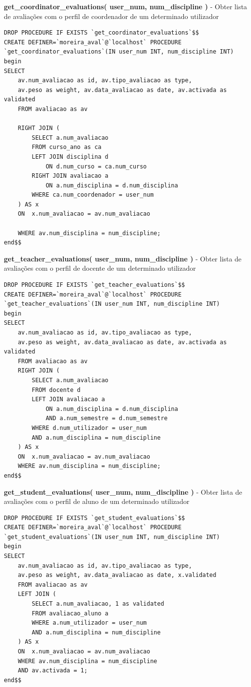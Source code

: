 \begin{list}{\textbf{-}}{\textbf{STORED PROCEDURES}}
\item \textbf{get\_coordinator\_evaluations( user\_num, num\_discipline )} - Obter lista de avaliações com o perfil de coordenador de um determinado utilizador
\begin{lstlisting}
DROP PROCEDURE IF EXISTS `get_coordinator_evaluations`$$
CREATE DEFINER=`moreira_aval`@`localhost` PROCEDURE `get_coordinator_evaluations`(IN user_num INT, num_discipline INT)
begin
SELECT 
	av.num_avaliacao as id, av.tipo_avaliacao as type, 
	av.peso as weight, av.data_avaliacao as date, av.activada as validated
	FROM avaliacao as av
	
	RIGHT JOIN (
		SELECT a.num_avaliacao	
		FROM curso_ano as ca
		LEFT JOIN disciplina d
			ON d.num_curso = ca.num_curso
		RIGHT JOIN avaliacao a
			ON a.num_disciplina = d.num_disciplina
		WHERE ca.num_coordenador = user_num
	) AS x 
	ON  x.num_avaliacao = av.num_avaliacao

	WHERE av.num_disciplina = num_discipline;
end$$
\end{lstlisting}

\item \textbf{get\_teacher\_evaluations( user\_num, num\_discipline )} - Obter lista de avaliações com o perfil de docente de um determinado utilizador
\begin{lstlisting}
DROP PROCEDURE IF EXISTS `get_teacher_evaluations`$$
CREATE DEFINER=`moreira_aval`@`localhost` PROCEDURE `get_teacher_evaluations`(IN user_num INT, num_discipline INT)
begin
SELECT 
	av.num_avaliacao as id, av.tipo_avaliacao as type, 
	av.peso as weight, av.data_avaliacao as date, av.activada as validated
	FROM avaliacao as av
	RIGHT JOIN (
		SELECT a.num_avaliacao
		FROM docente d
		LEFT JOIN avaliacao a
			ON a.num_disciplina = d.num_disciplina
			AND a.num_semestre = d.num_semestre
		WHERE d.num_utilizador = user_num
		AND a.num_disciplina = num_discipline
	) AS x 
	ON  x.num_avaliacao = av.num_avaliacao
	WHERE av.num_disciplina = num_discipline;
end$$
\end{lstlisting}

\item \textbf{get\_student\_evaluations( user\_num, num\_discipline )} - Obter lista de avaliações com o perfil de aluno de um determinado utilizador
\begin{lstlisting}
DROP PROCEDURE IF EXISTS `get_student_evaluations`$$
CREATE DEFINER=`moreira_aval`@`localhost` PROCEDURE `get_student_evaluations`(IN user_num INT, num_discipline INT)
begin
SELECT 
	av.num_avaliacao as id, av.tipo_avaliacao as type, 
	av.peso as weight, av.data_avaliacao as date, x.validated
	FROM avaliacao as av
	LEFT JOIN (
		SELECT a.num_avaliacao, 1 as validated	
		FROM avaliacao_aluno a
		WHERE a.num_utilizador = user_num
		AND a.num_disciplina = num_discipline
	) AS x 
	ON  x.num_avaliacao = av.num_avaliacao
	WHERE av.num_disciplina = num_discipline
	AND av.activada = 1;
end$$
\end{lstlisting}


\end{list}
